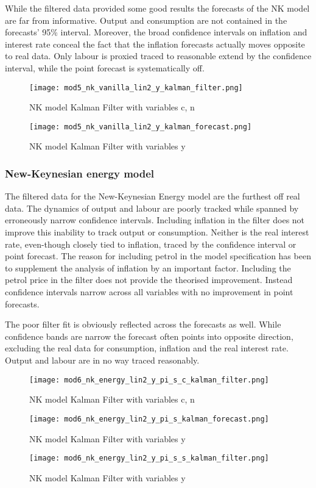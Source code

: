 \documentclass[12pt,a4paper,english]{article} %
\begin{document}
	While the filtered data provided some good results the forecasts of the NK model are far from informative. Output and consumption are not contained in the forecasts' 95\% interval. Moreover, the broad confidence intervals on inflation and interest rate conceal the fact that the inflation forecasts actually moves opposite to real data. Only labour is proxied traced to reasonable extend by the confidence interval, while the point forecast is systematically off.
	\begin{figure}[H]
		\begin{center}
			\texttt{[image: mod5\_nk\_vanilla\_lin2\_y\_kalman\_filter.png]}
			\caption{NK model Kalman Filter with variables c, n}\label{fig:nk_kfil}
			\texttt{[image: mod5\_nk\_vanilla\_lin2\_y\_kalman\_forecast.png]}
			\caption{NK model Kalman Filter with variables y}\label{fig:nk_kfor}
		\end{center}
	\end{figure}
	
	
	\subsubsection{New-Keynesian energy model}
	The filtered data for the New-Keynesian Energy model are the furthest off real data. The dynamics of output and labour are poorly tracked while spanned by erroneously narrow confidence intervals. Including inflation in the filter does not improve this inability to track output or consumption. Neither is the real interest rate, even-though closely tied to inflation, traced by the confidence interval or point forecast.
	The reason for including petrol in the model specification has been to supplement the analysis of inflation by an important factor. Including the petrol price in the filter does not provide the theorised improvement. Instead confidence intervals narrow across all variables with no improvement in point forecasts. 
	
	The poor filter fit is obviously reflected across the forecasts as well. While confidence bands are narrow the forecast often points into opposite direction, excluding the real data for consumption, inflation and the real interest rate. Output and labour are in no way traced reasonably.
	\begin{figure}[H]
		\begin{center}
			\texttt{[image: mod6\_nk\_energy\_lin2\_y\_pi\_s\_c\_kalman\_filter.png]}
			\caption{NK model Kalman Filter with variables c, n}\label{fig:nke_fil}
			
			\texttt{[image: mod6\_nk\_energy\_lin2\_y\_pi\_s\_kalman\_forecast.png]}
			\caption{NK model Kalman Filter with variables y}\label{fig:nke_for}
			
			\texttt{[image: mod6\_nk\_energy\_lin2\_y\_pi\_s\_s\_kalman\_filter.png]}
			\caption{NK model Kalman Filter with variables y}\label{fig:nke_fil_s}
		\end{center}
	\end{figure}
\end{document}
